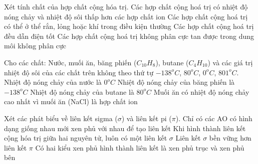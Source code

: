 \begin{ex}
	Xét tính chất của hợp chất cộng hóa trị.
	\choiceTF
	{\True Các hợp chất cộng hoá trị có nhiệt độ nóng chảy và nhiệt độ sôi thấp hơn các hợp chất ion}
	{\True Các hợp chất cộng hoá trị có thể ở thể rắn, lỏng hoặc khí trong điều kiện thường}
	{Các hợp chất cộng hoá trị đều dẫn điện tốt}
	{\True Các hợp chất cộng hoá trị không phân cực tan được trong dung môi không phân cực}
\end{ex}
\begin{ex}
	Cho các chất: Nước, muối ăn, băng phiến ($C_{10}H_8$), butane ($C_4H_{10}$) và các giá trị nhiệt độ sôi của các chất trên không theo thứ tự $-138^oC$, $80^oC$, $0^oC$, $801^oC$.
	\choiceTF
	{\True Nhiệt độ nóng chảy của nước là $0^oC$}
	{Nhiệt độ nóng chảy của băng phiến là $-138^oC$}
	{Nhiệt độ nóng chảy của butane là $80^oC$}
	{\True Muối ăn có nhiệt độ nóng chảy cao nhất vì muối ăn (NaCl) là hợp chất ion}
\end{ex}
\begin{ex}[CD-SBT]
	Xét các phát biểu về liên kết sigma ($\sigma$) và liên kết pi ($\pi$).
	\choiceTF
	{Chỉ có các AO có hình dạng giống nhau mới xen phủ với nhau để tạo liên kết}
	{\True Khi hình thành liên kết cộng hóa trị giữa hai nguyên tử, luôn có một liên kết $\sigma$}
	{\True Liên kết $\sigma$ bền vững hơn liên kết $\pi$}
	{\True Có hai kiểu xen phủ hình thành liên kết là xen phủ trục và xen phủ bên}
\end{ex}
